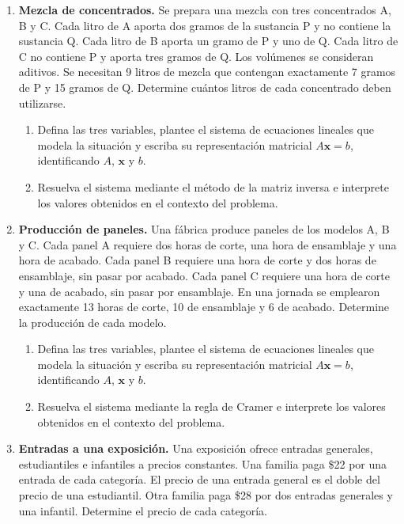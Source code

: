 \documentclass[11pt,a4paper]{article}
\begin{document}
\begin{enumerate}
\begin{enumerate}
    \item Defina las tres variables, plantee el sistema de ecuaciones lineales que modela la situación y escriba su representación matricial $A\mathbf{x}=b$, identificando $A$, $\mathbf{x}$ y $b$.
    \item Resuelva el sistema mediante la regla de Cramer e interprete los valores obtenidos en el contexto del problema.
\end{enumerate}
\newpage
\item \textbf{Mezcla de concentrados.} Se prepara una mezcla con tres concentrados A, B y C. Cada litro de A aporta dos gramos de la sustancia P y no contiene la sustancia Q. Cada litro de B aporta un gramo de P y uno de Q. Cada litro de C no contiene P y aporta tres gramos de Q. Los volúmenes se consideran aditivos. Se necesitan 9 litros de mezcla que contengan exactamente 7 gramos de P y 15 gramos de Q. Determine cuántos litros de cada concentrado deben utilizarse.

\begin{enumerate}
    \item Defina las tres variables, plantee el sistema de ecuaciones lineales que modela la situación y escriba su representación matricial $A\mathbf{x}=b$, identificando $A$, $\mathbf{x}$ y $b$.
    \item Resuelva el sistema mediante el método de la matriz inversa e interprete los valores obtenidos en el contexto del problema.
\end{enumerate}
\item \textbf{Producción de paneles.} Una fábrica produce paneles de los modelos A, B y C. Cada panel A requiere dos horas de corte, una hora de ensamblaje y una hora de acabado. Cada panel B requiere una hora de corte y dos horas de ensamblaje, sin pasar por acabado. Cada panel C requiere una hora de corte y una de acabado, sin pasar por ensamblaje. En una jornada se emplearon exactamente 13 horas de corte, 10 de ensamblaje y 6 de acabado. Determine la producción de cada modelo.

\begin{enumerate}
    \item Defina las tres variables, plantee el sistema de ecuaciones lineales que modela la situación y escriba su representación matricial $A\mathbf{x}=b$, identificando $A$, $\mathbf{x}$ y $b$.
    \item Resuelva el sistema mediante la regla de Cramer e interprete los valores obtenidos en el contexto del problema.
\end{enumerate}
\item \textbf{Entradas a una exposición.} Una exposición ofrece entradas generales, estudiantiles e infantiles a precios constantes. Una familia paga \$22 por una entrada de cada categoría. El precio de una entrada general es el doble del precio de una estudiantil. Otra familia paga \$28 por dos entradas generales y una infantil. Determine el precio de cada categoría.


\end{enumerate}
\end{document}
